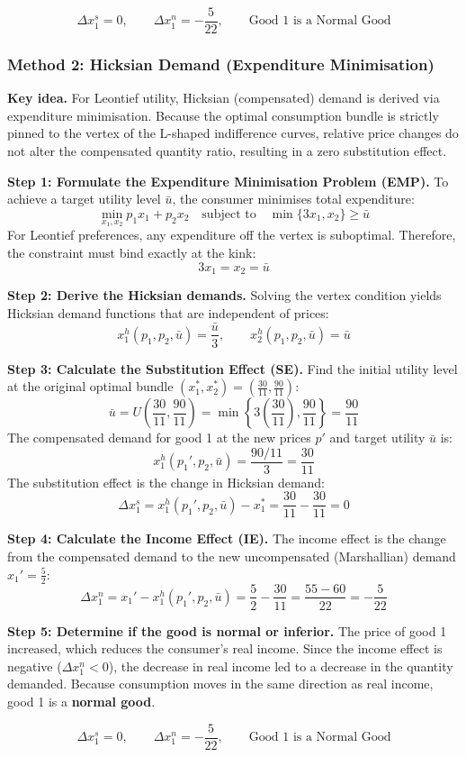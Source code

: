 \documentclass[12pt]{article}
\begin{document}
\begin{enumerate}[label=(\alph*)]
$$\boxed{\Delta x_1^s = 0, \qquad \Delta x_1^n = -\frac{5}{22}, \qquad \text{Good 1 is a Normal Good}}$$


\subsubsection*{Method 2: Hicksian Demand (Expenditure Minimisation)}
\noindent\textbf{Key idea.} For Leontief utility, Hicksian (compensated) demand is derived via expenditure minimisation. Because the optimal consumption bundle is strictly pinned to the vertex of the L-shaped indifference curves, relative price changes do not alter the compensated quantity ratio, resulting in a zero substitution effect.

\textbf{Step 1: Formulate the Expenditure Minimisation Problem (EMP).}
To achieve a target utility level $\bar{u}$, the consumer minimises total expenditure:
$$\min_{x_1, x_2} p_1 x_1 + p_2 x_2 \quad \text{subject to} \quad \min\{3x_1, x_2\} \ge \bar{u}$$
For Leontief preferences, any expenditure off the vertex is suboptimal. Therefore, the constraint must bind exactly at the kink:
$$3x_1 = x_2 = \bar{u}$$

\textbf{Step 2: Derive the Hicksian demands.}
Solving the vertex condition yields Hicksian demand functions that are independent of prices:
$$x_1^h(p_1, p_2, \bar{u}) = \frac{\bar{u}}{3}, \qquad x_2^h(p_1, p_2, \bar{u}) = \bar{u}$$

\textbf{Step 3: Calculate the Substitution Effect (SE).}
Find the initial utility level at the original optimal bundle $(x_1^*, x_2^*) = \left(\frac{30}{11}, \frac{90}{11}\right)$:
$$\bar{u} = U\left(\frac{30}{11}, \frac{90}{11}\right) = \min\left\{3\left(\frac{30}{11}\right), \frac{90}{11}\right\} = \frac{90}{11}$$
The compensated demand for good 1 at the new prices $p'$ and target utility $\bar{u}$ is:
$$x_1^h(p_1', p_2, \bar{u}) = \frac{90/11}{3} = \frac{30}{11}$$
The substitution effect is the change in Hicksian demand:
$$\Delta x_1^s = x_1^h(p_1', p_2, \bar{u}) - x_1^* = \frac{30}{11} - \frac{30}{11} = 0$$

\textbf{Step 4: Calculate the Income Effect (IE).}
The income effect is the change from the compensated demand to the new uncompensated (Marshallian) demand $x_1' = \frac{5}{2}$:
$$\Delta x_1^n = x_1' - x_1^h(p_1', p_2, \bar{u}) = \frac{5}{2} - \frac{30}{11} = \frac{55 - 60}{22} = -\frac{5}{22}$$

\textbf{Step 5: Determine if the good is normal or inferior.}
The price of good 1 increased, which reduces the consumer's real income. Since the income effect is negative ($\Delta x_1^n < 0$), the decrease in real income led to a decrease in the quantity demanded. Because consumption moves in the same direction as real income, good 1 is a \textbf{normal good}.

\bigskip


$$\boxed{\Delta x_1^s = 0, \qquad \Delta x_1^n = -\frac{5}{22}, \qquad \text{Good 1 is a Normal Good}}$$

\end{enumerate}
\end{document}
